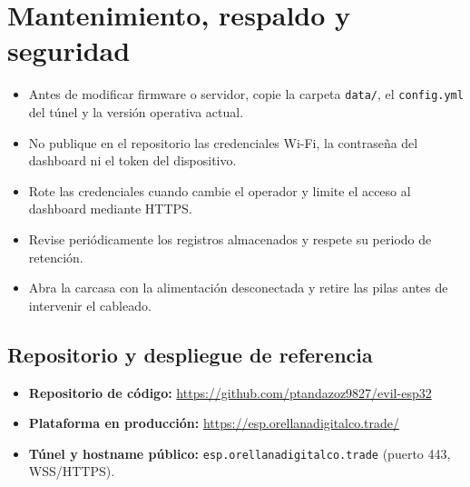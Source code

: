 \documentclass[12pt,a4paper,oneside]{report}
\newcommand{\code}[1]{\texttt{\small #1}}
\newcommand{\plataformaurl}{\url{https://esp.orellanadigitalco.trade/}}
\newcommand{\repourl}{\url{https://github.com/ptandazoz9827/evil-esp32}}
\begin{document}
\chapter{Mantenimiento, respaldo y seguridad}
\label{cap:mantenimiento}

\begin{itemize}[leftmargin=1.5em]
  \item Antes de modificar firmware o servidor, copie la carpeta \code{data/}, el
  \code{config.yml} del túnel y la versión operativa actual.
  \item No publique en el repositorio las credenciales Wi-Fi, la contraseña del
  dashboard ni el token del dispositivo.
  \item Rote las credenciales cuando cambie el operador y limite el acceso al
  dashboard mediante HTTPS.
  \item Revise periódicamente los registros almacenados y respete su periodo de retención.
  \item Abra la carcasa con la alimentación desconectada y retire las pilas antes de
  intervenir el cableado.
\end{itemize}

\section{Repositorio y despliegue de referencia}
\begin{itemize}[leftmargin=1.4em]
  \item \textbf{Repositorio de código:} \repourl
  \item \textbf{Plataforma en producción:} \plataformaurl
  \item \textbf{Túnel y hostname público:} \code{esp.orellanadigitalco.trade} (puerto 443, WSS/HTTPS).
\end{itemize}
\end{document}
